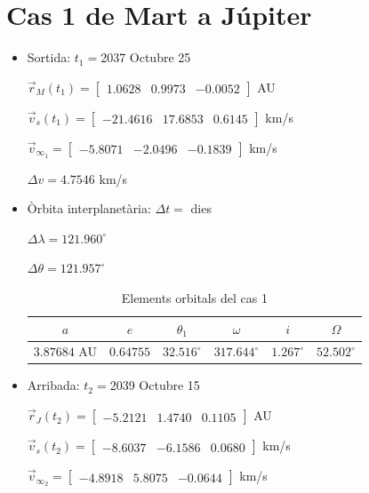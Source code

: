 \section{Cas 1 de Mart a Júpiter}
\begin{itemize}
	\item Sortida: $t_{1}=$2037 Octubre 25

$\vec{r}_{M}(t_{1})=\begin{bmatrix}1.0628 & 0.9973 & -0.0052\end{bmatrix}$ AU

$\vec{v}_{s}(t_{1})=\begin{bmatrix}-21.4616 & 17.6853 & 0.6145\end{bmatrix}$ km/s

$\vec{v}_{\infty_{1}}= \begin{bmatrix}-5.8071 & -2.0496 & -0.1839\end{bmatrix}$ km/s

$\Delta v=4.7546$ km/s

	\item Òrbita interplanetària: $\Delta t=$ dies

$\Delta\lambda=121.960^{\circ}$

$\Delta\theta=121.957^{\circ}$
\begin{table}[h!]
	\centering
	\begin{tabular}{ |c|c|c|c|c|c|}
		\hline
		$a$ & $e$ & $\theta_{1}$ & $\omega$ & $i$ & $\Omega$ \\ \hline
		$3.87684$ AU  & $0.64755$ & $32.516^{\circ}$ & $317.644^{\circ}$ & $1.267^{\circ}$ & $52.502^{\circ}$ \\ \hline
	\end{tabular}
	\caption{Elements orbitals del cas 1}
\end{table}
	\item Arribada: $t_{2}=$2039 Octubre 15

$\vec{r}_{J}(t_{2})=\begin{bmatrix}-5.2121 & 1.4740 & 0.1105\end{bmatrix}$ AU

$\vec{v}_{s}(t_{2})=\begin{bmatrix}-8.6037 & -6.1586 & 0.0680\end{bmatrix}$ km/s


$\vec{v}_{\infty_{2}}=\begin{bmatrix}-4.8918 & 5.8075 & -0.0644\end{bmatrix}$ km/s
\end{itemize}
